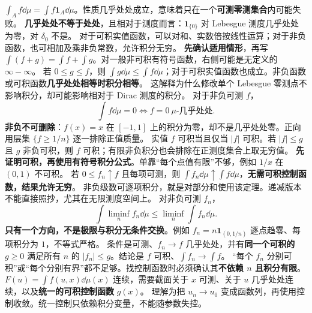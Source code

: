 $\int_A f\dd\mu=\int f\mathbf1_A\dd\mu$。性质几乎处处成立，意味着只在一个\textbf{可测零测集合}内可能失败。
\textbf{几乎处处不等于处处}，且相对于测度而言：$\mathbf1_{\{0\}}$ 对 Lebesgue 测度几乎处处为零，对 $\delta_0$ 不是。
对于可积实值函数，可以对和、实数倍按线性运算；对于非负函数，也可相加及乘非负常数，允许积分无穷。
\textbf{先确认适用情形}，再写 $\int(f+g)=\int f+\int g$。对一般非可积有符号函数，右侧可能是无定义的 $\infty-\infty$。
若 $0\le g\le f$，则 $\int g\dd\mu\le\int f\dd\mu$；对于可积实值函数也成立。非负函数或可积函数\textbf{几乎处处相等时积分相等}。
这解释为什么修改单个 Lebesgue 零测点不影响积分，却可能影响相对于 Dirac 测度的积分。
对于非负可测 $f$，
\[
\int f\dd\mu=0\iff f=0\ \mu\text{-几乎处处}.
\]
\textbf{非负不可删除}：$f(x)=x$ 在 $[-1,1]$ 上的积分为零，却不是几乎处处零。正向用层集 $\{f\ge1/n\}$ 逐一排除正值质量。
实值 $f$ 可积当且仅当 $|f|$ 可积。若 $|f|\le g$ 且 $g$ 非负可积，则 $f$ 可积；有限非负积分也会排除在正测度集合上取无穷值。
\textbf{先证明可积，再使用有符号积分公式}。单靠“每个点值有限”不够，例如 $1/x$ 在 $(0,1)$ 不可积。
若 $0\le f_n\uparrow f$ 且每项可测，则 $\int f_n\dd\mu\uparrow\int f\dd\mu$，\textbf{无需可积控制函数，结果允许无穷}。
非负级数可逐项积分，就是对部分和使用该定理。递减版本不能直接照抄，尤其在无限测度空间上。
对非负可测 $f_n$，
\[
\int\liminf_n f_n\dd\mu\le\liminf_n\int f_n\dd\mu.
\]
\textbf{只有一个方向，不是极限与积分无条件交换}。例如 $f_n=n\mathbf1_{(0,1/n)}$ 逐点趋零、每项积分为 $1$，不等式严格。
条件是可测、$f_n\to f$ 几乎处处，并有\textbf{同一个可积的} $g\ge0$ 满足所有 $n$ 的 $|f_n|\le g$。结论是 $f$ 可积、$\int f_n\to\int f$。
“每个 $f_n$ 分别可积”或“每个分别有界”都不足够。找控制函数时必须确认其\textbf{不依赖 $n$ 且积分有限}。
$F(u)=\int f(u,x)\dd\mu(x)$ 连续，需要截面关于 $x$ 可测、关于 $u$ 几乎处处连续，以及\textbf{统一的可积控制函数} $g(x)$。
理解为把 $u_n\to u_0$ 变成函数列，再使用控制收敛。统一控制只依赖积分变量，不能随参数失控。
